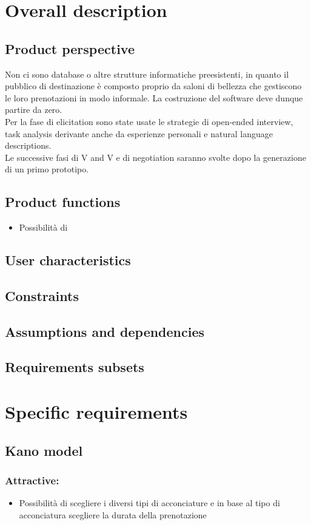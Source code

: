 \documentclass{article}
\begin{document}
\section {Overall description} 
\subsection {Product perspective} 
Non ci sono database o altre strutture informatiche preesistenti, in quanto il pubblico di destinazione è composto proprio da saloni di bellezza che gestiscono le loro prenotazioni in modo informale. La costruzione del software deve dunque partire da zero.
\\ Per la fase di elicitation sono state usate le strategie di open-ended interview, task analysis derivante anche da esperienze personali e natural language descriptions. 
\\ Le successive fasi di V and V e di negotiation saranno svolte dopo la generazione di un primo prototipo.
\subsection {Product functions} 
\begin{itemize}
\item Possibilità di
\end{itemize}
\subsection {User characteristics} 
\subsection {Constraints} 
\subsection {Assumptions and dependencies}
\subsection {Requirements subsets} 
\section {Specific requirements}

\subsection{Kano model}
\subsubsection{Attractive:}
\begin{itemize}
    \item Possibilità di scegliere i diversi tipi di acconciature e in 
    base al tipo di acconciatura scegliere la durata della prenotazione 
\end{itemize}
\end{document}
